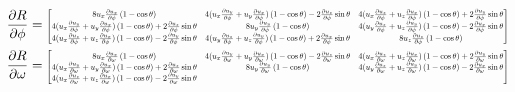 \documentclass[12pt]{article}
\newcommand*{\Scale}[2][4]{\scalebox{#1}{$#2$}}%
\begin{document}
\begin{align}
\frac{\partial R}{\partial\phi} &= \Scale[0.60]{\begin{bmatrix}  
8u_x\frac{\partial u_x}{\partial\phi} \left(1-\cos \theta\right) 
& 4(u_x\frac{\partial u_y}{\partial\phi} +  u_y\frac{\partial u_x}{\partial\phi}) \left(1-\cos \theta\right) - 2\frac{\partial u_z}{\partial\phi} \sin \theta 
& 4(u_x\frac{\partial u_z}{\partial\phi} +  u_z\frac{\partial u_x}{\partial\phi}) \left(1-\cos \theta\right) + 2\frac{\partial u_y}{\partial\phi} \sin \theta 
\\ 4(u_x\frac{\partial u_y}{\partial\phi} +  u_y\frac{\partial u_x}{\partial\phi}) \left(1-\cos \theta\right) + 2\frac{\partial u_z}{\partial\phi} \sin \theta 
& 8u_y\frac{\partial u_y}{\partial\phi} \left(1-\cos \theta\right) 
& 4(u_y\frac{\partial u_z}{\partial\phi} +  u_z\frac{\partial u_y}{\partial\phi}) \left(1-\cos \theta\right) - 2\frac{\partial u_x}{\partial\phi} \sin \theta 
\\ 4(u_x\frac{\partial u_z}{\partial\phi} +  u_z\frac{\partial u_x}{\partial\phi}) \left(1-\cos \theta\right) - 2\frac{\partial u_y}{\partial\phi} \sin \theta 
& 4(u_y\frac{\partial u_z}{\partial\phi} +  u_z\frac{\partial u_y}{\partial\phi}) \left(1-\cos \theta\right) + 2\frac{\partial u_x}{\partial\phi} \sin \theta 
& 8u_z\frac{\partial u_z}{\partial\phi} \left(1-\cos \theta\right) \end{bmatrix}} \\
\frac{\partial R}{\partial\omega} &= \Scale[0.60]{\begin{bmatrix}  
8u_x\frac{\partial u_x}{\partial\omega} \left(1-\cos \theta\right) 
& 4(u_x\frac{\partial u_y}{\partial\omega} +  u_y\frac{\partial u_x}{\partial\omega}) \left(1-\cos \theta\right) - 2\frac{\partial u_z}{\partial\omega} \sin \theta 
& 4(u_x\frac{\partial u_z}{\partial\omega} +  u_z\frac{\partial u_x}{\partial\omega}) \left(1-\cos \theta\right) + 2\frac{\partial u_y}{\partial\omega} \sin \theta 
\\ 4(u_x\frac{\partial u_y}{\partial\omega} +  u_y\frac{\partial u_x}{\partial\omega}) \left(1-\cos \theta\right) + 2\frac{\partial u_z}{\partial\omega} \sin \theta 
& 8u_y\frac{\partial u_y}{\partial\omega} \left(1-\cos \theta\right) 
& 4(u_y\frac{\partial u_z}{\partial\omega} +  u_z\frac{\partial u_y}{\partial\omega}) \left(1-\cos \theta\right) - 2\frac{\partial u_x}{\partial\omega} \sin \theta 
\\ 4(u_x\frac{\partial u_z}{\partial\omega} +  u_z\frac{\partial u_x}{\partial\omega}) \left(1-\cos \theta\right) - 2\frac{\partial u_y}{\partial\omega} \sin \theta 

\end{bmatrix}}
\end{align}
\end{document}
